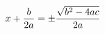 \documentclass[preview]{standalone}
\begin{document}
\begin{align*}
\special{dvisvgm:raw <g id='unique000'>}x + \frac{b}{2a} = \pm\frac{\sqrt{b^2 - 4ac}}{2a}\special{dvisvgm:raw </g>}
\end{align*}
\end{document}
